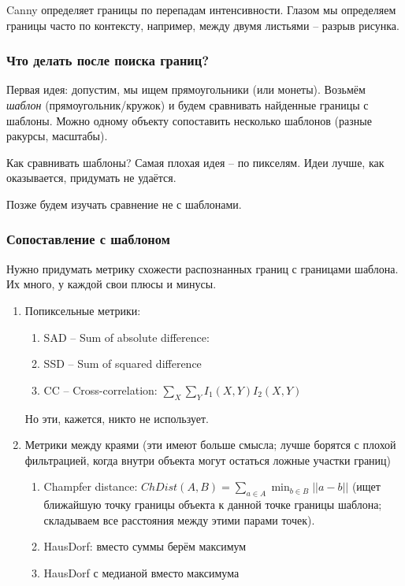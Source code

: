 \documentclass[main.tex]{subfiles}
\begin{document}
Canny определяет границы по перепадам интенсивности.
Глазом мы определяем границы часто по контексту, например, между двумя листьями -- разрыв рисунка.

\subsubsection{Что делать после поиска границ?}

Первая идея: допустим, мы ищем прямоугольники (или монеты).
Возьмём \emph{шаблон} (прямоугольник/кружок) и будем сравнивать найденные границы с шаблоны.
Можно одному объекту сопоставить несколько шаблонов (разные ракурсы, масштабы).

Как сравнивать шаблоны?
Самая плохая идея -- по пикселям.
Идеи лучше, как оказывается, придумать не удаётся.

Позже будем изучать сравнение не с шаблонами.

\subsubsection{Сопоставление с шаблоном}

Нужно придумать метрику схожести распознанных границ с границами шаблона.
Их много, у каждой свои плюсы и минусы.
\begin{enumerate}
	\item Попиксельные метрики:
	\begin{enumerate}[noitemsep]
		\item SAD -- Sum of absolute difference:
		\item SSD -- Sum of squared difference
		\item CC -- Cross-correlation: $ \sum_X \sum_Y I_1(X,Y)I_2(X,Y) $
	\end{enumerate}
	
	Но эти, кажется, никто не использует.
	
	\item Метрики между краями (эти имеют больше смысла; лучше борятся с плохой фильтрацией, когда внутри объекта могут остаться ложные участки границ)
	
	\begin{enumerate}[noitemsep]
		\item Champfer distance: $ ChDist(A,B)=\sum_{a \in A} \min_{b \in B} ||a-b|| $ (ищет ближайшую точку границы объекта к данной точке границы шаблона; складываем все расстояния между этими парами точек).
		\item HausDorf: вместо суммы берём максимум
		\item HausDorf с медианой вместо максимума
	\end{enumerate}
\end{enumerate}
\end{document}
